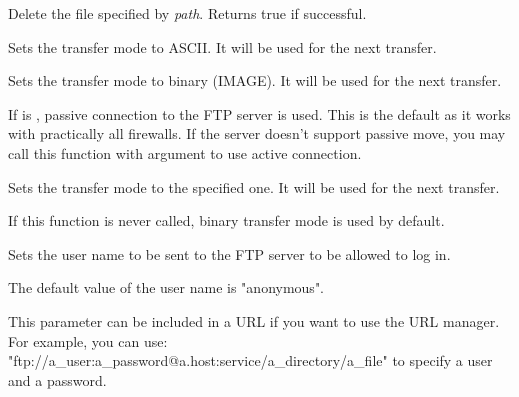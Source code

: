Delete the file specified by {\it path}. Returns true if successful.



\label{wxftpsetascii}


Sets the transfer mode to ASCII. It will be used for the next transfer.


\label{wxftpsetbinary}


Sets the transfer mode to binary (IMAGE). It will be used for the next transfer.


\label{wxftpsetpassive}


If  is \true, passive connection to the FTP server is used. This is
the default as it works with practically all firewalls. If the server doesn't
support passive move, you may call this function with \false argument to use
active connection.


\label{wxftpsettransfermode}


Sets the transfer mode to the specified one. It will be used for the next
transfer.

If this function is never called, binary transfer mode is used by default.



\label{wxftpsetuser}


Sets the user name to be sent to the FTP server to be allowed to log in.


The default value of the user name is "anonymous".


This parameter can be included in a URL if you want to use the URL manager.
For example, you can use: "ftp://a\_user:a\_password@a.host:service/a\_directory/a\_file"
to specify a user and a password.


